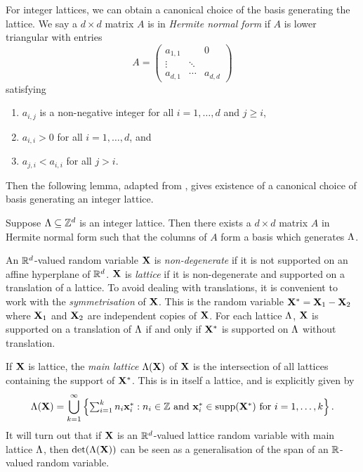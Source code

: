 For integer lattices, we can obtain a canonical choice of the basis generating the lattice. We say a $d \times d$ matrix $A$ is in \emph{Hermite normal form} if $A$ is lower triangular with entries 
\begin{equation*}
    A = \begin{pmatrix}
        a_{1, 1} &        & 0 \\
        \vdots   & \ddots &   \\
        a_{d, 1} & \cdots & a_{d, d}
    \end{pmatrix}
\end{equation*}
satisfying
\begin{enumerate}
    \item $a_{i, j}$ is a non-negative integer for all $i = 1, \ldots, d$ and $j \geq i$,
    \item $a_{i, i} > 0$ for all $i = 1, \ldots, d$, and
    \item $a_{j, i} < a_{i, i}$ for all $j > i$.
\end{enumerate}
Then the following lemma, adapted from \cite[Corollary 1]{casselsIntroductionGeometryNumbers1997}, gives existence of a canonical choice of basis generating an integer lattice.
\begin{lemma}
    \label{lem:hnf-basis}
    Suppose $\Lambda \subseteq {\mathbb Z}^d$ is an integer lattice. Then there exists a $d \times d$ matrix $A$ in Hermite normal form such that the columns of $A$ form a basis which generates $\Lambda$.
\end{lemma}

An ${\mathbb R}^d$-valued random variable ${\mathbf X}$ is \emph{non-degenerate} if it is not supported on an affine hyperplane of ${\mathbb R}^d$. ${\mathbf X}$ is \emph{lattice} if it is non-degenerate and supported on a translation of a lattice. To avoid dealing with translations, it is convenient to work with the \emph{symmetrisation} of ${\mathbf X}$. This is the random variable ${\mathbf X}^* = {\mathbf X}_1 - {\mathbf X}_2$ where ${\mathbf X}_1$ and ${\mathbf X}_2$ are independent copies of ${\mathbf X}$. For each lattice $\Lambda$, ${\mathbf X}$ is supported on a translation of $\Lambda$ if and only if ${\mathbf X}^*$ is supported on $\Lambda$ without translation.

If ${\mathbf X}$ is lattice, the \emph{main lattice} $\Lambda({\mathbf X})$ of ${\mathbf X}$ is the intersection of all lattices containing the support of ${\mathbf X}^*$. This is in itself a lattice, and is explicitly given by
\begin{equation*}
    \Lambda({\mathbf X}) = \bigcup_{k=1}^{\infty} \left\{ 
        \textstyle \sum_{i=1}^k n_i {\mathbf x}^*_i : \text{$n_i \in {\mathbb Z}$ and ${\mathbf x}^*_i \in \operatorname{supp}({\mathbf X}^*)$ for $i = 1, \ldots, k$}
    \right\}.
\end{equation*}
It will turn out that if ${\mathbf X}$ is an ${\mathbb R}^d$-valued lattice random variable with main lattice $\Lambda$, then $\det(\Lambda({\mathbf X}))$ can be seen as a generalisation of the span of an ${\mathbb R}$-valued random variable.

